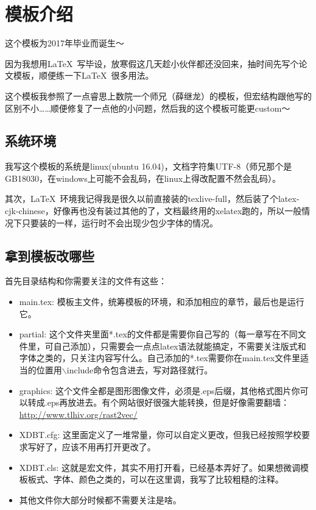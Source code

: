 \chapter{模板介绍}
\label{chap:introduction}

这个模板为2017年毕业而诞生～

因为我想用\LaTeX{}~写毕设，放寒假这几天趁小伙伴都还没回来，抽时间先写个论文模板，顺便练一下\LaTeX{}~很多用法。

这个模板我参照了一点睿思上数院一个师兄（薛继龙）的模板，但宏结构跟他写的区别不小……顺便修复了一点他的小问题，然后我的这个模板可能更custom～

\section{系统环境}
我写这个模板的系统是linux(ubuntu 16.04)，文档字符集UTF-8（师兄那个是GB18030，在windows上可能不会乱码，在linux上得改配置不然会乱码）。

其次，\LaTeX{}~环境我记得我是很久以前直接装的texlive-full，然后装了个latex-cjk-chinese，好像再也没有装过其他的了，文档最终用的xelatex跑的，所以一般情况下只要装的一样，运行时不会出现少包少字体的情况。

\section{拿到模板改哪些}
首先目录结构和你需要关注的文件有这些：
\begin{itemize}
\item main.tex: 模板主文件，统筹模板的环境，和添加相应的章节，最后也是运行它。
\item partial: 这个文件夹里面*.tex的文件都是需要你自己写的（每一章写在不同文件里，可自己添加），只需要会一点点latex语法就能搞定，不需要关注版式和字体之类的，只关注内容写什么。自己添加的*.tex需要你在main.tex文件里适当的位置用$\backslash$include命令包含进去，写对路径就行。
\item graphics: 这个文件全都是图形图像文件，必须是.eps后缀，其他格式图片你可以转成.eps再放进去。有个网站很好很强大能转换，但是好像需要翻墙：\href{http://www.tlhiv.org/rast2vec/}{http://www.tlhiv.org/rast2vec/}
\item XDBT.cfg: 这里面定义了一堆常量，你可以自定义更改，但我已经按照学校要求写好了，应该不用再打开更改了。
\item XDBT.cls: 这就是宏文件，其实不用打开看，已经基本弄好了。如果想微调模板板式、字体、颜色之类的，可以在这里调，我写了比较粗糙的注释。
\item 其他文件你大部分时候都不需要关注是啥。
\end{itemize}

